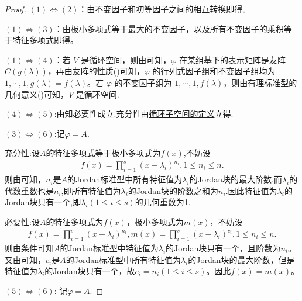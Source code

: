 \documentclass[../../main.tex]{subfiles}
\begin{document}
\begin{proof}
\((1)\Leftrightarrow(2)\)：由不变因子和初等因子之间的相互转换即得。

\((1)\Leftrightarrow(3)\)：由极小多项式等于最大的不变因子，以及所有不变因子的乘积等于特征多项式即得。 

\((1)\Leftrightarrow(4)\)：若 \(V\) 是循环空间，则由可知，\(\varphi\) 在某组基下的表示矩阵是友阵 \(C(g(\lambda))\)，再由友阵的性质()可知，\(\varphi\) 的行列式因子组和不变因子组均为 \(1,\cdots,1,g(\lambda)=f(\lambda)\)。若 \(\varphi\) 的不变因子组为 \(1,\cdots,1,f(\lambda)\)，则由有理标准型的几何意义()可知，\(V\) 是循环空间.

\((4)\Leftrightarrow(5)\):由知必要性成立.充分性由\hyperref[definition:循环子空间和循环空间]{循环子空间的定义}立得.

\((3)\Leftrightarrow(6)\):记$\varphi=A$.

{\heiti 充分性:}设$A$的特征多项式等于极小多项式为$f\left( x \right)$,不妨设
\begin{align*}
f\left( x \right) =\prod_{i=1}^s{\left( x-\lambda _i \right) ^{n_i}},1\leqslant n_i\leqslant n.
\end{align*}
则由可知，$n_i$是$A$的Jordan标准型中所有特征值为$\lambda _i$的Jordan块的最大阶数.而$\lambda_i$的代数重数也是$n_i$,即所有特征值为$\lambda_i$的Jordan块的阶数之和为$n_i$.因此特征值为$\lambda_i$的Jordan块只有一个,即$\lambda_i(1\leqslant i\leqslant s)$的几何重数为1.

{\heiti 必要性:}设$A$的特征多项式为$f\left( x \right)$，极小多项式为$m\left( x \right)$，不妨设
\begin{align*}
f\left( x \right) =\prod_{i=1}^s{\left( x-\lambda _i \right) ^{n_i}},m\left( x \right) =\prod_{i=1}^s{\left( x-\lambda _i \right) ^{c_i}},1\leqslant n_i\leqslant n.
\end{align*}
则由条件可知$A$的Jordan标准型中特征值为$\lambda _i$的Jordan块只有一个，且阶数为$n_i$。又由可知，$c_i$是$A$的Jordan标准型中所有特征值为$\lambda _i$的Jordan块的最大阶数，但是特征值为$\lambda _i$的Jordan块只有一个，故$c_i=n_i\left( 1\leqslant i\leqslant s \right)$。因此$f\left( x \right) =m\left( x \right)$。

\((5)\Leftrightarrow(6)\):
记$\varphi=A$.


\end{proof}
\end{document}
